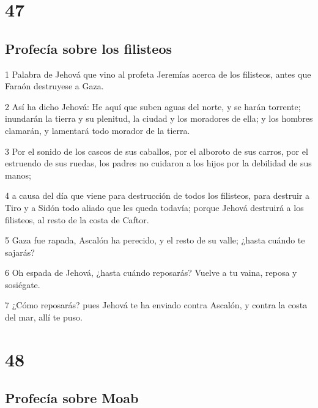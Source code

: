 \chapter{47}

\section*{Profecía sobre los filisteos}

\par 1 Palabra de Jehová que vino al profeta Jeremías acerca de los filisteos, antes que Faraón destruyese a Gaza.
\par 2 Así ha dicho Jehová: He aquí que suben aguas del norte, y se harán torrente; inundarán la tierra y su plenitud, la ciudad y los moradores de ella; y los hombres clamarán, y lamentará todo morador de la tierra.
\par 3 Por el sonido de los cascos de sus caballos, por el alboroto de sus carros, por el estruendo de sus ruedas, los padres no cuidaron a los hijos por la debilidad de sus manos;
\par 4 a causa del día que viene para destrucción de todos los filisteos, para destruir a Tiro y a Sidón todo aliado que les queda todavía; porque Jehová destruirá a los filisteos, al resto de la costa de Caftor.
\par 5 Gaza fue rapada, Ascalón ha perecido, y el resto de su valle; ¿hasta cuándo te sajarás?
\par 6 Oh espada de Jehová, ¿hasta cuándo reposarás? Vuelve a tu vaina, reposa y sosiégate.
\par 7 ¿Cómo reposarás? pues Jehová te ha enviado contra Ascalón, y contra la costa del mar, allí te puso.

\chapter{48}

\section*{Profecía sobre Moab}


